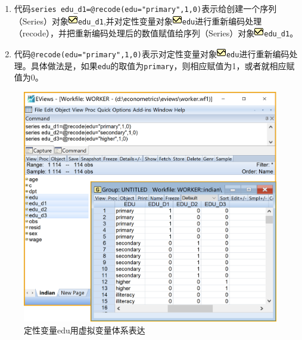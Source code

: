 \documentclass[12pt,(landscape,a4paper),(portrait,a4paper)]{article}
\providecommand{\tightlist}{%
  \setlength{\itemsep}{0pt}\setlength{\parskip}{0pt}}
\theoremstyle{definition}
\theoremstyle{definition}
\theoremstyle{definition}
\theoremstyle{remark}
\begin{document}
\begin{itemize}
\begin{enumerate}
    \begin{enumerate}
    \def\labelenumii{\alph{enumii}.}
    \tightlist
    \item
      代码\texttt{series\ edu\_d1=@recode(edu="primary",1,0)}表示给创建一个序列（Series）对象\includegraphics{picture/object/Series.png}\texttt{edu\_d1},并对定性变量对象\includegraphics{picture/object/Series.png}\texttt{edu}进行重新编码处理（recode），并把重新编码处理后的数值赋值给序列（Series）对象\includegraphics{picture/object/Series.png}\texttt{edu\_d1}。
    \item
      代码\texttt{@recode(edu="primary",1,0)}表示对定性变量对象\includegraphics{picture/object/Series.png}\texttt{edu}进行重新编码处理。具体做法是，如果\texttt{edu}的取值为\texttt{primary}，则相应赋值为1，或者就相应赋值为0。
    \end{enumerate}
  \end{enumerate}
\end{itemize}

\begin{figure}

{\centering \includegraphics[width=23.36in]{picture/lab8-dummy-model/1-dummy-edu} 

}

\caption{定性变量edu用虚拟变量体系表达}\label{fig:fig-dummy-edu}
\end{figure}
\end{document}
